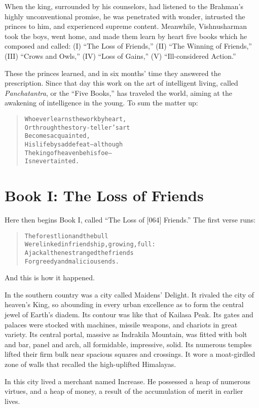 \documentclass[article, twoside, 14pt]{memoir}
\renewenvironment{verbatim}{%
\begin{quote}%
\vskip -10pt%
\begin{alltt}\normalfont\large}{\end{alltt}%
\end{quote}%
\vskip -10pt
} %
\begin{document}
When the king, surrounded by his counselors, had listened to the
Brahman's highly unconventional promise, he was penetrated with
wonder, intrusted the princes to him, and experienced supreme
content. Meanwhile, Vishnusharman took the boys, went home, and
made them learn by heart five books which he composed and called:
(I) ``The Loss of Friends,'' (II) ``The Winning of Friends,'' (III)
``Crows and Owls,'' (IV) ``Loss of Gains,'' (V)
``Ill-considered Action.''

These the princes learned, and in six months' time they answered
the prescription. Since that day this work on the art of
intelligent living, called \emph{Panchatantra}, or the
``Five Books,'' has traveled the world, aiming at the awakening of
intelligence in the young. To sum the matter up:

\begin{verbatim}
Whoever learns the work by heart,
Or through the story-teller's art
    Becomes acquainted,
His life by sad defeat--although
The king of heaven be his foe--
    Is never tainted.
\end{verbatim}
\section{Book I: The Loss of Friends}

\label{s0}

Here then begins Book I, called ``The Loss of [064] Friends.'' The
first verse runs:

\begin{verbatim}
The forest lion and the bull
Were linked in friendship, growing, full:
A jackal then estranged the friends
For greedy and malicious ends.
\end{verbatim}
And this is how it happened.

In the southern country was a city called Maidens'
\label{s1}Delight. It rivaled the city of heaven's King, so
abounding in every urban excellence as to form the central jewel of
Earth's diadem. Its contour was like that of Kailasa Peak. Its
gates and palaces were stocked with machines, missile weapons, and
chariots in great variety. Its central portal, massive as Indrakila
Mountain, was fitted with bolt and bar, panel and arch, all
formidable, impressive, solid. Its numerous temples lifted their
firm bulk near spacious squares and crossings. It wore a
moat-girdled zone of walls that recalled the high-uplifted
Himalayas.

In this city lived a merchant named Increase. He possessed a heap
of numerous virtues, and a heap of money, a result of the
accumulation of merit in earlier lives.
\end{document}

